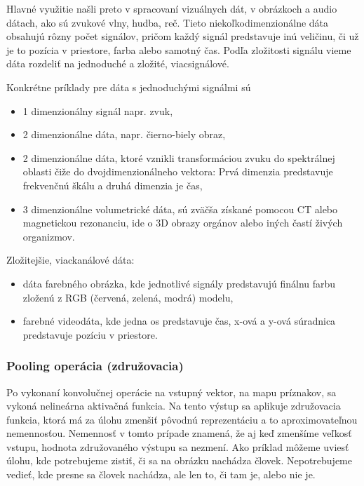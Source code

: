 \hspace{10mm}Hlavné využitie našli preto v spracovaní vizuálnych dát, v obrázkoch a audio dátach, ako sú zvukové vlny, hudba, reč. Tieto niekoľkodimenzionálne dáta obsahujú rôzny počet signálov, pričom každý signál predstavuje inú veličinu, či už je to pozícia v priestore, farba alebo samotný čas. Podľa zložitosti signálu vieme dáta rozdeliť na jednoduché a zložité, viacsignálové. 
 

Konkrétne príklady pre dáta s jednoduchými signálmi sú
\begin{itemize}
    \item 1 dimenzionálny signál napr. zvuk,
    \item 2 dimenzionálne dáta, napr. čierno-biely obraz,
    \item 2 dimenzionálne dáta, ktoré vznikli transformáciou zvuku do spektrálnej oblasti čiže do dvojdimenzionálneho vektora: Prvá dimenzia predstavuje frekvenčnú škálu a druhá dimenzia je čas,
    \item 3 dimenzionálne volumetrické dáta, sú zväčša získané pomocou CT alebo magnetickou rezonanciu, ide o 3D obrazy orgánov alebo iných častí živých organizmov.
\end{itemize}
Zložitejšie, viackanálové dáta:
\begin{itemize}
    \item dáta farebného obrázka, kde jednotlivé signály predstavujú finálnu farbu zloženú z RGB (červená, zelená, modrá) modelu,
    \item farebné videodáta, kde jedna os predstavuje čas, x-ová  a y-ová súradnica predstavuje pozíciu v priestore.  
\end{itemize}

\subsubsection{Pooling operácia (združovacia)}

\hspace{10mm}Po vykonaní konvolučnej operácie na vstupný vektor, na mapu príznakov, sa vykoná nelineárna aktivačná funkcia. Na tento výstup sa aplikuje združovacia funkcia, ktorá má za úlohu zmenšiť pôvodnú reprezentáciu a to aproximovateľnou nemennosťou. Nemennosť v tomto prípade znamená, že aj keď zmenšíme veľkosť vstupu, hodnota združovaného výstupu sa nezmení. Ako príklad môžeme uviesť úlohu, kde potrebujeme zistiť, či sa na obrázku nachádza človek. Nepotrebujeme vedieť, kde presne sa človek nachádza, ale len to, či tam je, alebo nie je.


